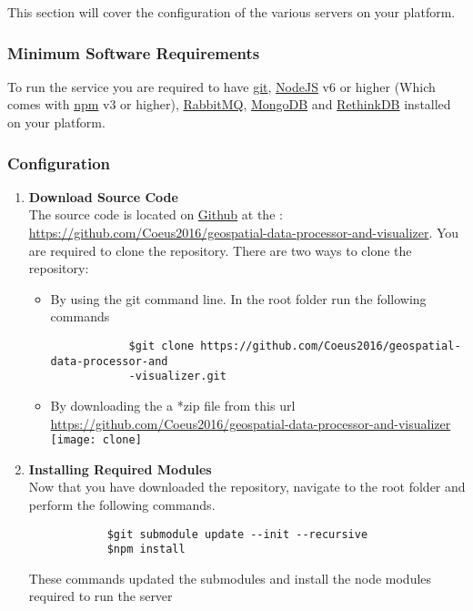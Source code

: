 This section will cover the configuration of the various servers on your platform. 
\subsubsection{Minimum Software Requirements}
To run the service you are required to have \href{https://git-scm.com}{git}, \href{https://nodejs.org}{NodeJS} v6 or higher (Which comes with \href{https://www.npmjs.com}{npm} v3 or higher), \href{https://www.rabbitmq.com/download.html}{RabbitMQ}, \href{https://www.mongodb.com/download-center?jmp=nav#community}{MongoDB} and \href{http://rethinkdb.com/docs/install}{RethinkDB} installed on your platform.
\subsubsection{Configuration}
	\begin{enumerate}
		\item \textbf{Download Source Code} \\
		The source code is located on \href{https://github.com}{Github} at the : \url{https://github.com/Coeus2016/geospatial-data-processor-and-visualizer}. You are required to clone the repository. There are two ways to clone the repository:\\
		\begin{itemize}
			\item By using the git command line. In the root folder run the following commands
			\begin{verbatim}
			$git clone https://github.com/Coeus2016/geospatial-data-processor-and
			-visualizer.git		
			\end{verbatim}
		
		\item By downloading the a *zip file from this url \url{https://github.com/Coeus2016/geospatial-data-processor-and-visualizer}\\
		\texttt{[image: clone]} \\[0.5cm]
		
		\end{itemize}
		
		\item \textbf{Installing Required Modules}\\
		Now that you have downloaded the repository, navigate to the root folder and perform the following commands.
		\begin{verbatim}
			$git submodule update --init --recursive
			$npm install			
			\end{verbatim}
			These commands updated the submodules and install the node modules required to run the server	
	\end{enumerate}


